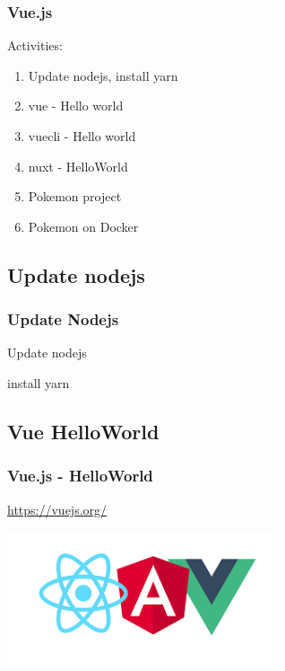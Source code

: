 \documentclass{beamer}
\begin{document}
\begin{frame}\frametitle{Vue.js} 
 Activities:
\begin{enumerate}
\item
  Update nodejs, install yarn
\item
  vue - Hello world 
\item
  vuecli - Hello world 
\item    
  nuxt - HelloWorld
\item  
  Pokemon project
\item  
  Pokemon on Docker

\end{enumerate}

\end{frame}


\subsection{Update nodejs} 
\begin{frame}\frametitle{Update Nodejs} 
 
\begin{block}{Update nodejs}
  \lstupdatenodejs
\end{block}

\begin{block}{install yarn}
  \lstinstallyarn
\end{block}

\end{frame}



\subsection{Vue HelloWorld} 
\begin{frame}\frametitle{Vue.js - HelloWorld} 
 
 \url{https://vuejs.org/}


\begin{center}
\includegraphics[width=0.6\textwidth]{frontend.png}
\end{center}
\end{frame}
\end{document}
